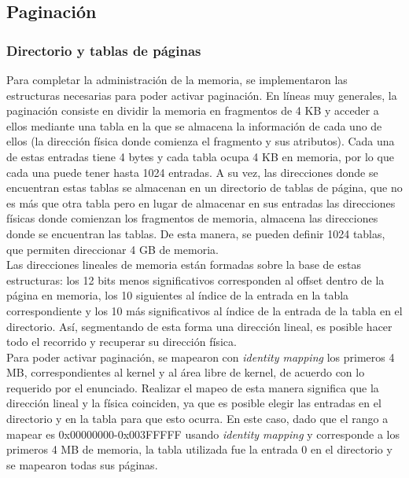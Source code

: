 \documentclass[a4paper]{article}
\begin{document}
\subsection{Paginación}

\subsubsection{Directorio y tablas de páginas}
Para completar la administración de la memoria, se implementaron las estructuras necesarias para poder activar paginación. En líneas muy generales, la paginación consiste en dividir la memoria en fragmentos de 4 KB y acceder a ellos mediante una tabla en la que se almacena la información de cada uno de ellos (la dirección física donde comienza el fragmento y sus atributos). Cada una de estas entradas tiene 4 bytes y cada tabla ocupa 4 KB en memoria, por lo que cada una puede tener hasta 1024 entradas. A su vez, las direcciones donde se encuentran estas tablas se almacenan en un directorio de tablas de página, que no es más que otra tabla pero en lugar de almacenar en sus entradas las direcciones físicas donde comienzan los fragmentos de memoria, almacena las direcciones donde se encuentran las tablas. De esta manera, se pueden definir 1024 tablas, que permiten direccionar 4 GB de memoria. \\
Las direcciones lineales de memoria están formadas sobre la base de estas estructuras: los 12 bits menos significativos corresponden al offset dentro de la página en memoria, los 10 siguientes al índice de la entrada en la tabla correspondiente y los 10 más significativos al índice de la entrada de la tabla en el directorio. Así, segmentando de esta forma una dirección lineal, es posible hacer todo el recorrido y recuperar su dirección física. \\
Para poder activar paginación, se mapearon con \textit{identity mapping} los primeros 4 MB, correspondientes al kernel y al área libre de kernel, de acuerdo con lo requerido por el enunciado. Realizar el mapeo de esta manera significa que la dirección lineal y la física coinciden, ya que es posible elegir las entradas en el directorio y en la tabla para que esto ocurra. En este caso, dado que el rango a mapear es 0x00000000-0x003FFFFF usando \textit{identity mapping} y corresponde a los primeros 4 MB de memoria, la tabla utilizada fue la entrada 0 en el directorio y se mapearon todas sus páginas. \\
\end{document}
